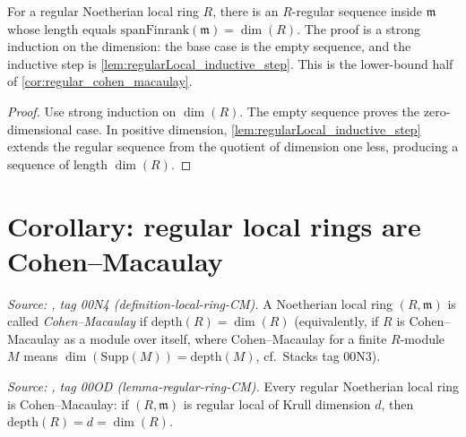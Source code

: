 \begin{lemma}\leanok
  \label{lem:exists_isRegular_of_regularLocal}
  For a regular Noetherian local ring \(R\), there is an \(R\)-regular sequence inside
  \(\mathfrak m\) whose length equals \(\text{spanFinrank}(\mathfrak m) = \dim(R)\). The proof is a
  strong induction on the dimension: the base case is the empty sequence, and the
  inductive step is \cref{lem:regularLocal_inductive_step}. This is the lower-bound half
  of \cref{cor:regular_cohen_macaulay}.
\end{lemma}
\begin{proof}

\leanok
  Use strong induction on \(\dim(R)\). The empty sequence proves the
  zero-dimensional case. In positive dimension,
  \cref{lem:regularLocal_inductive_step} extends the regular sequence from
  the quotient of dimension one less, producing a sequence of length
  \(\dim(R)\).
\end{proof}

\section{Corollary: regular local rings are Cohen--Macaulay}
\label{sec:ab_regular_cm}

\begin{definition}\leanok
  \label{def:cohen_macaulay_local}
  \textit{Source: \cite{stacks-project}, tag 00N4 (definition-local-ring-CM).}
  A Noetherian local ring \((R, \mathfrak{m})\) is called \emph{Cohen--Macaulay} if
  \(\text{depth}(R) = \dim(R)\) (equivalently, if \(R\) is Cohen--Macaulay as a module
  over itself, where Cohen--Macaulay for a finite \(R\)-module \(M\) means
  \(\dim(\text{Supp}(M)) = \text{depth}(M)\), cf.\ Stacks tag 00N3).
\end{definition}

\begin{corollary}\leanok
  \label{cor:regular_cohen_macaulay}
  \textit{Source: \cite{stacks-project}, tag 00OD (lemma-regular-ring-CM).}
  Every regular Noetherian local ring is Cohen--Macaulay: if \((R, \mathfrak{m})\) is
  regular local of Krull dimension \(d\), then \(\text{depth}(R) = d = \dim(R)\).
\end{corollary}

